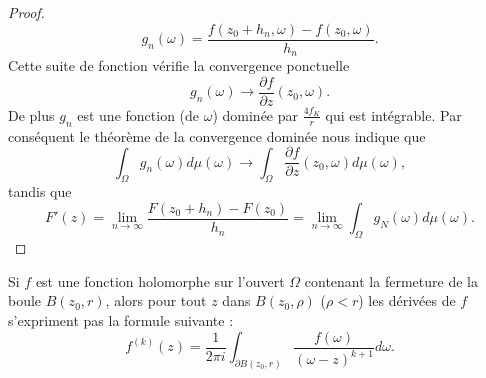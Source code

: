 \begin{proof}
\begin{equation}
        g_n(\omega)=\frac{ f(z_0+h_n,\omega)-f(z_0,\omega) }{ h_n }.
    \end{equation}
    Cette suite de fonction vérifie la convergence ponctuelle
    \begin{equation}
        g_n(\omega)\to\frac{ \partial f }{ \partial z }(z_0,\omega).
    \end{equation}
    De plus \( g_n\) est une fonction (de \( \omega\)) dominée par \( \frac{ 4f_K }{ r }\) qui est intégrable. Par conséquent le théorème de la convergence dominée nous indique que
    \begin{equation}
        \int_{\Omega}g_n(\omega)d\mu(\omega)\to \int_{\Omega}\frac{ \partial f }{ \partial z }(z_0,\omega)d\mu(\omega),
    \end{equation}
    tandis que
    \begin{equation}
        F'(z)=\lim_{n\to \infty} \frac{ F(z_0+h_n)-F(z_0) }{ h_n }=\lim_{n\to \infty} \int_{\Omega}g_N(\omega)d\mu(\omega).
    \end{equation}
\end{proof}

\begin{corollary}       \label{CorNxTjEj}
    Si \( f\) est une fonction holomorphe sur l'ouvert \( \Omega\) contenant la fermeture de la boule \( B(z_0,r)\), alors pour tout \( z\) dans \( B(z_0,\rho)\) (\( \rho<r\)) les dérivées de \( f\) s'expriment pas la formule suivante :
    \begin{equation}
        f^{(k)}(z)=\frac{1}{ 2\pi i }\int_{\partial B(z_0,r)}\frac{ f(\omega) }{ (\omega-z)^{k+1} }d\omega.
    \end{equation}
\end{corollary}

